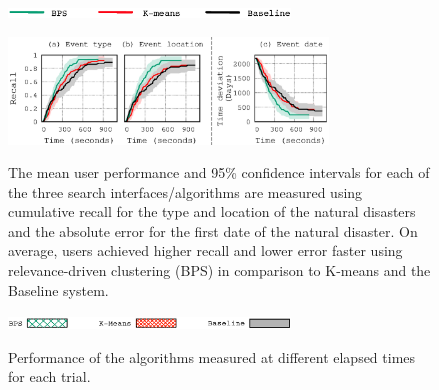 \begin{figure}[t]
\begin{centering}
\includegraphics[width=7.5cm]{imgs/legend3}
\par\end{centering}
\begin{centering}
{\includegraphics[width=8.5cm]{imgs/nd_recall}}
\par\end{centering}
\caption{The mean user performance and 95\% confidence intervals for each of the three search interfaces/algorithms are measured using cumulative recall for the type and location of the natural disasters and the absolute error for the first date of the natural disaster.  On average, users achieved higher recall and lower error faster using relevance-driven clustering (BPS) in comparison to K-means and the Baseline system.}
\label{fig:UserSurveyRecall}
\end{figure}





\begin{figure}[t]
\begin{centering}
\includegraphics[width=7.5cm]{imgs/legend4}\\
\par\end{centering}
\caption{Performance of the algorithms measured at different elapsed times for each trial.}
\label{fig:UserSurveyRecallStage}
\end{figure}



